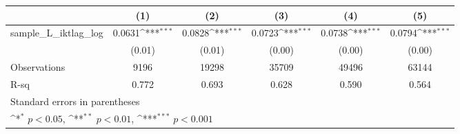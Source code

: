 {
\def\sym#1{\ifmmode^{#1}\else\(^{#1}\)\fi}
\begin{tabular}{l*{5}{c}}
\hline\hline
          &\multicolumn{1}{c}{(1)}         &\multicolumn{1}{c}{(2)}         &\multicolumn{1}{c}{(3)}         &\multicolumn{1}{c}{(4)}         &\multicolumn{1}{c}{(5)}         \\
\hline
sample\_L\_iktlag\_log&   0.0631\sym{***}&   0.0828\sym{***}&   0.0723\sym{***}&   0.0738\sym{***}&   0.0794\sym{***}\\
          &   (0.01)         &   (0.01)         &   (0.00)         &   (0.00)         &   (0.00)         \\
\hline
Observations&     9196         &    19298         &    35709         &    49496         &    63144         \\
R-sq      &    0.772         &    0.693         &    0.628         &    0.590         &    0.564         \\
\hline\hline
\multicolumn{6}{l}{\footnotesize Standard errors in parentheses}\\
\multicolumn{6}{l}{\footnotesize \sym{*} \(p<0.05\), \sym{**} \(p<0.01\), \sym{***} \(p<0.001\)}\\
\end{tabular}
}
